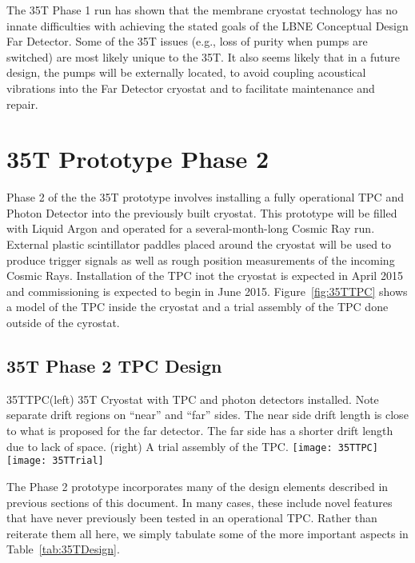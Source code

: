 The 35T Phase 1 run has shown that the membrane cryostat technology has no innate difficulties with 
achieving the stated goals of the LBNE Conceptual Design Far Detector. Some of the 35T issues (e.g., loss 
of purity when pumps are switched) are most likely unique to the 35T. It also seems likely that in a future 
design, the pumps will be externally located, to avoid coupling acoustical vibrations into the Far Detector 
cryostat and to facilitate maintenance and repair.


\section{35T Prototype Phase 2}

Phase 2 of the the 35T prototype involves installing a fully operational TPC and Photon Detector into 
the previously built cryostat.
This prototype will be filled with Liquid Argon and operated for a several-month-long Cosmic Ray run. 
External plastic scintillator paddles placed around the cryostat will be used to produce
trigger signals as well as rough position measurements of the incoming Cosmic Rays.
Installation of the TPC inot the cryostat is expected in April 2015 and 
commissioning is expected to begin in June 2015.
Figure~\ref{fig:35TTPC} shows a model of the TPC inside the cryostat and a trial assembly of
the TPC done outside of the cyrostat. 

\subsection{35T Phase 2 TPC Design}

\begin{cdrfigure}{35TTPC}{(left) 35T Cryostat with TPC and photon detectors installed. 
Note separate drift regions on ``near'' and ``far'' sides.
The near side drift length is close to what is proposed for the far detector. The far
side has a shorter drift length due to lack of space.
(right) A trial assembly of the TPC.
}
\texttt{[image: 35TTPC]}  
\texttt{[image: 35TTrial]}  
\end{cdrfigure}

The Phase 2 prototype incorporates many of the design elements described in previous
sections of this document.
In many cases, these include novel features that have never previously been tested
in an operational TPC.
Rather than reiterate them all here, we simply tabulate some of the more important
aspects in Table~\ref{tab:35TDesign}.

